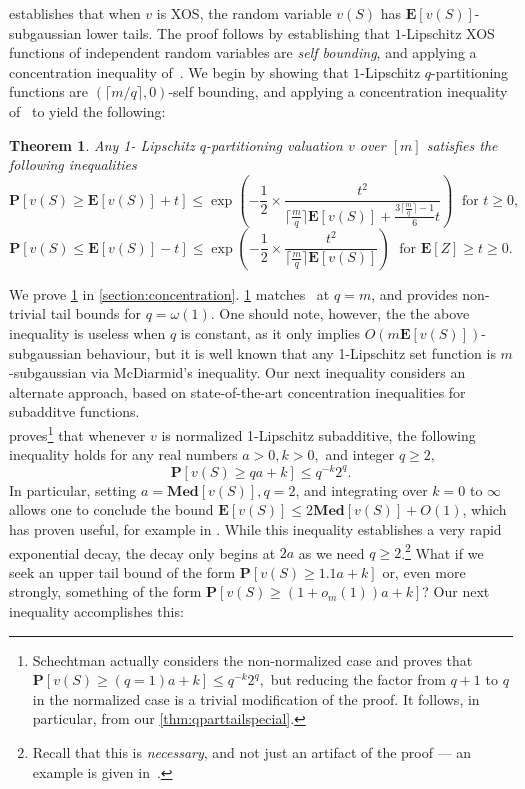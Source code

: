 \documentclass[11pt]{article}\usepackage{amsfonts}
\newtheorem{theorem}{Theorem}
\numberwithin{theorem}{subsection}
\newcommand{\prob}{\mathbf{P}}
\newcommand{\median}{\mathbf{Med}}
\newcommand{\expect}{\mathbf{E}}
\begin{document}
\cite{Vondrak10} establishes that when $v$ is XOS, the random variable $v(S)$ has $\expect[v(S)]$-subgaussian lower tails. The proof follows by establishing that $1$-Lipschitz XOS functions of independent random variables are \emph{self bounding}, and applying a concentration inequality of~\cite{BoucheronLM00}. We begin by showing that $1$-Lipschitz $q$-partitioning functions are $(\lceil m/q\rceil,0)$-self bounding, and applying a concentration inequality of~\cite{McDiarmidR06,BoucheronLM09} to yield the following:

\begin{theorem}
\label{thm:selfboundingqpart}
Any 1- Lipschitz $q$-partitioning valuation $v$ over $[m]$ satisfies the following inequalities
$$
\prob\left[v(S)\ge \expect[v(S)] + t\right]\le
\exp\left(-\frac{1}{2}\times\frac{t^2}{\lceil\frac{m}{q}\rceil \expect[v(S)] + \frac{3\lceil \frac{m}{q}\rceil-1}{6}t}\right)\;\text { for }t\ge 0,
$$
$$
\prob[v(S)\le \expect[v(S)] - t]\le
\exp\left(-\frac{1}{2}\times\frac{t^2}{\lceil\frac{m}{q}\rceil \expect[v(S)]}\right)\;\text{ for }\expect[Z]\ge t\ge 0.
$$
\end{theorem}

We prove \cref{thm:selfboundingqpart} in \cref{section:concentration}. \cref{thm:selfboundingqpart} matches~\cite{Vondrak10} at $q=m$, and provides non-trivial tail bounds for $q = \omega(1)$. One should note, however, the the above inequality is useless when $q$ is constant, as it only implies $O(m\expect[v(S)])$-subgaussian behaviour, but it is well known that any 1-Lipschitz set function is $m$-subgaussian via McDiarmid's inequality. Our next inequality considers an alternate approach, based on state-of-the-art concentration inequalities for subadditve functions.\\

\cite{schectman} proves\footnote{Schechtman actually considers the non-normalized case and proves that $\prob[v(S)\ge (q=1)a + k]\le 
q^{-k}2^q,$ but reducing the factor from $q+1$ to $q$ in the normalized case is a trivial modification of the proof. It follows, in particular, from our \cref{thm:qparttailspecial}.} that whenever $v$ is normalized 1-Lipschitz subadditive, the following inequality holds for any real numbers $a>0, k>0,$ and integer $q\ge 2,$ \begin{equation}
\label{eq:schehtman}
\prob[v(S)\ge qa + k]\le 
q^{-k}2^q.
\end{equation} In particular, setting $a = \median[v(S)],q=2$, and integrating over $k=0$ to $\infty$ allows one to conclude the bound $\expect[v(S)]\le 2\median[v(S)] + O(1)$, which has proven useful, for example in \cite{RubinsteinW18}. While this inequality establishes a very rapid exponential decay, the decay only begins at  $2a$ as we need $q\ge 2$.\footnote{Recall that this is \emph{necessary}, and not just an artifact of the proof --- an example is given in~\cite{Vondrak10}.} What if we seek an upper tail bound of the form $\prob[v(S)\ge 1.1a + k]$ or, even more strongly, something of the form  $\prob[v(S)\ge (1 + {o_m(1)})a + k]$? Our next inequality accomplishes this:
\end{document}
